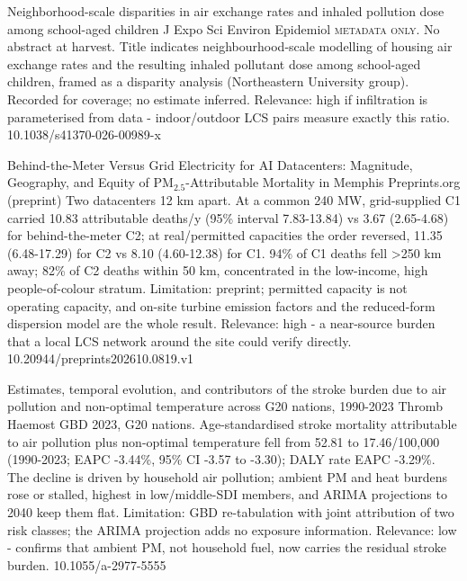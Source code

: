 \documentclass[10pt]{article}
\begin{document}
{Neighborhood-scale disparities in air exchange rates and inhaled pollution dose among school-aged children}
{J Expo Sci Environ Epidemiol}
{\textsc{metadata only.} No abstract at harvest. Title indicates neighbourhood-scale modelling of housing air exchange rates and the resulting inhaled pollutant dose among school-aged children, framed as a disparity analysis (Northeastern University group). Recorded for coverage; no estimate inferred. Relevance: high if infiltration is parameterised from data - indoor/outdoor LCS pairs measure exactly this ratio.}
{10.1038/s41370-026-00989-x}

\par{}\baselineskip{}\baselineskip
{}

{Behind-the-Meter Versus Grid Electricity for AI Datacenters: Magnitude, Geography, and Equity of PM$_{2.5}$-Attributable Mortality in Memphis}
{Preprints.org (preprint)}
{Two datacenters 12 km apart. At a common 240 MW, grid-supplied C1 carried 10.83 attributable deaths/y (95\% interval 7.83-13.84) vs 3.67 (2.65-4.68) for behind-the-meter C2; at real/permitted capacities the order reversed, 11.35 (6.48-17.29) for C2 vs 8.10 (4.60-12.38) for C1. 94\% of C1 deaths fell >250 km away; 82\% of C2 deaths within 50 km, concentrated in the low-income, high people-of-colour stratum. Limitation: preprint; permitted capacity is not operating capacity, and on-site turbine emission factors and the reduced-form dispersion model are the whole result. Relevance: high - a near-source burden that a local LCS network around the site could verify directly.}
{10.20944/preprints202610.0819.v1}

{Estimates, temporal evolution, and contributors of the stroke burden due to air pollution and non-optimal temperature across G20 nations, 1990-2023}
{Thromb Haemost}
{GBD 2023, G20 nations. Age-standardised stroke mortality attributable to air pollution plus non-optimal temperature fell from 52.81 to 17.46/100,000 (1990-2023; EAPC -3.44\%, 95\% CI -3.57 to -3.30); DALY rate EAPC -3.29\%. The decline is driven by household air pollution; ambient PM and heat burdens rose or stalled, highest in low/middle-SDI members, and ARIMA projections to 2040 keep them flat. Limitation: GBD re-tabulation with joint attribution of two risk classes; the ARIMA projection adds no exposure information. Relevance: low - confirms that ambient PM, not household fuel, now carries the residual stroke burden.}
{10.1055/a-2977-5555}
\end{document}

